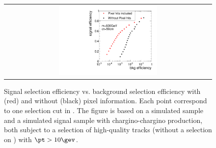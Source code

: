 \begin{figure}[!b]
\begin{tabular}{c}
    \includegraphics[width=0.49\textwidth]{figures/analysis/rocplot_wjets_mass_500GeV_ctau_50cm.pdf}
  \end{tabular}
  \caption{Signal selection efficiency vs. background selection efficiency with (red) and without (black) pixel information.
           Each point correspond to one selection cut in \ias.
           The figure is based on a simulated \WJets sample and a simulated signal sample with chargino-chargino production, both subject to a selection of high-quality tracks (without a selection on \nhits) with $\pt>10\gev$.}
  \label{fig:ROCplots}
\end{figure} 
